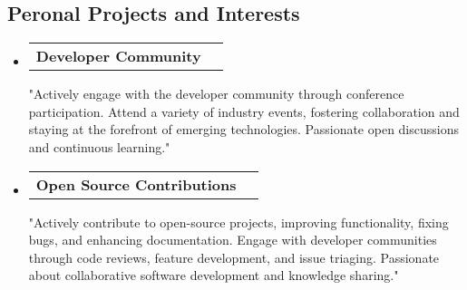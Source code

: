 \documentclass[10pt,letterpaper]{article}
\makeatletter
\newcommand{\headerrow}[2]
{\begin{tabular*}{\linewidth}{l@{\extracolsep{\fill}}r}
  #1 &
  #2 \\
\end{tabular*}}
\makeatother
\begin{document}
\vspace{-0.4em}
\subsection*{Peronal Projects and Interests}
\begin{itemize}
  \parskip=0.1em

  \item
  \headerrow
    {\textbf{Developer Community}}
    {\textbf{}}
    "Actively engage with the developer community through conference participation. Attend a variety of industry events, fostering collaboration and staying at the forefront of emerging technologies. Passionate open discussions and continuous learning."
  
    \item
    \headerrow
    {\textbf{Open Source Contributions}}
    {\textbf{}}
    "Actively contribute to open-source projects, improving functionality, fixing bugs, and enhancing documentation. Engage with developer communities through code reviews, feature development, and issue triaging. Passionate about collaborative software development and knowledge sharing."
\end{itemize}
\end{document}
